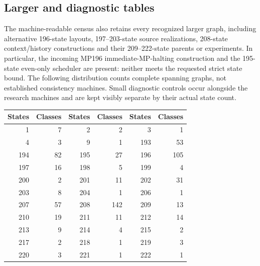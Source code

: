 \subsection{Larger and diagnostic tables}
The machine-readable census also retains every recognized larger graph,
including alternative 196-state layouts, 197--203-state source realizations,
208-state context/history constructions and their 209--222-state parents or
experiments. In particular, the incoming MP196 immediate-MP-halting construction
and the 195-state even-only scheduler are present: neither meets the requested
strict state bound. The following distribution counts complete spanning graphs,
not established consistency machines. Small diagnostic controls occur alongside
the research machines and are kept visibly separate by their actual state count.
\begin{center}\footnotesize\renewcommand{\arraystretch}{0.85}
\begin{tabular}{rr@{\qquad}rr@{\qquad}rr}
\toprule States & Classes & States & Classes & States & Classes \\ \midrule
1 & 7 & 2 & 2 & 3 & 1 \\
4 & 3 & 9 & 1 & 193 & 53 \\
194 & 82 & 195 & 27 & 196 & 105 \\
197 & 16 & 198 & 5 & 199 & 4 \\
200 & 2 & 201 & 11 & 202 & 31 \\
203 & 8 & 204 & 1 & 206 & 1 \\
207 & 57 & 208 & 142 & 209 & 13 \\
210 & 19 & 211 & 11 & 212 & 14 \\
213 & 9 & 214 & 4 & 215 & 2 \\
217 & 2 & 218 & 1 & 219 & 3 \\
220 & 3 & 221 & 1 & 222 & 1 \\
\bottomrule
\end{tabular}\end{center}
